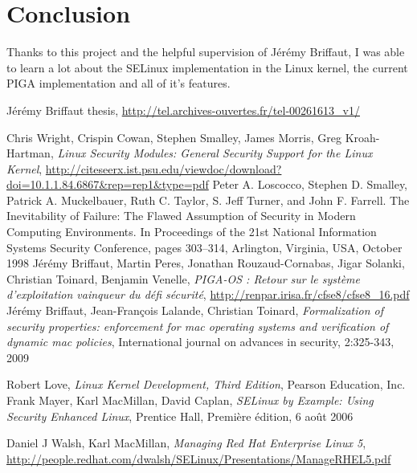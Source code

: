 \documentclass[pdftex,a4paper,titlepage,11pt]{article}
\begin{document}
\newpage

\section*{Conclusion} 

Thanks to this project and the helpful supervision of Jérémy Briffaut, I was able to learn a lot about the SELinux implementation in the Linux kernel, the current PIGA implementation and all of it's features.


\newpage


\begin{thebibliography}{40}

 Jérémy Briffaut thesis, \url{http://tel.archives-ouvertes.fr/tel-00261613_v1/}

 Chris Wright, Crispin Cowan, Stephen Smalley, James Morris, Greg Kroah-Hartman, \textit{Linux Security Modules: General Security Support for the Linux Kernel}, \url{http://citeseerx.ist.psu.edu/viewdoc/download?doi=10.1.1.84.6867&rep=rep1&type=pdf}
 Peter A. Loscocco, Stephen D. Smalley, Patrick A. Muckelbauer, Ruth C. Taylor, S. Jeff Turner, and John F. Farrell. The Inevitability of Failure: The Flawed Assumption of Security in Modern Computing Environments. In Proceedings of the 21st National Information Systems Security Conference, pages 303–314, Arlington, Virginia, USA, October 1998
 Jérémy Briffaut, Martin Peres, Jonathan Rouzaud-Cornabas, Jigar Solanki, Christian Toinard, Benjamin Venelle, \textit{PIGA-OS : Retour sur le système d'exploitation vainqueur du défi sécurité}, \url{http://renpar.irisa.fr/cfse8/cfse8_16.pdf}
 Jérémy Briffaut, Jean-François Lalande, Christian Toinard, \textit{Formalization of security properties: enforcement for mac operating systems and verification of dynamic mac policies}, International journal on advances in security, 2:325-343, 2009

 Robert Love, \textit{Linux Kernel Development, Third Edition}, Pearson Education, Inc.
 Frank Mayer, Karl MacMillan, David Caplan, \textit{SELinux by Example: Using Security Enhanced Linux}, Prentice Hall, Première édition, 6 août 2006

 Daniel J Walsh, Karl MacMillan, \textit{Managing Red Hat Enterprise Linux 5}, \url{http://people.redhat.com/dwalsh/SELinux/Presentations/ManageRHEL5.pdf}


\end{thebibliography}
\end{document}
